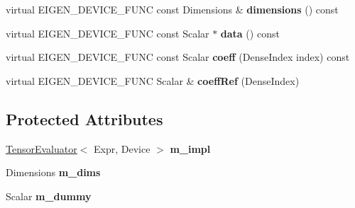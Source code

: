 \begin{DoxyCompactItemize}
virtual E\+I\+G\+E\+N\+\_\+\+D\+E\+V\+I\+C\+E\+\_\+\+F\+U\+NC const Dimensions \& {\bfseries dimensions} () const
\item 
\mbox{\label{class_eigen_1_1internal_1_1_tensor_lazy_evaluator_read_only_a7c8ec665c2e9effadbf47efed7f17b5a}} 
virtual E\+I\+G\+E\+N\+\_\+\+D\+E\+V\+I\+C\+E\+\_\+\+F\+U\+NC const Scalar $\ast$ {\bfseries data} () const
\item 
\mbox{\label{class_eigen_1_1internal_1_1_tensor_lazy_evaluator_read_only_a54b066c8eeaeda76c88ea9ed7cfa8293}} 
virtual E\+I\+G\+E\+N\+\_\+\+D\+E\+V\+I\+C\+E\+\_\+\+F\+U\+NC const Scalar {\bfseries coeff} (Dense\+Index index) const
\item 
\mbox{\label{class_eigen_1_1internal_1_1_tensor_lazy_evaluator_read_only_ac5b017f1ff541a4bbd93772bdb07d5e3}} 
virtual E\+I\+G\+E\+N\+\_\+\+D\+E\+V\+I\+C\+E\+\_\+\+F\+U\+NC Scalar \& {\bfseries coeff\+Ref} (Dense\+Index)
\end{DoxyCompactItemize}
\subsection*{Protected Attributes}
\begin{DoxyCompactItemize}
\item 
\mbox{\label{class_eigen_1_1internal_1_1_tensor_lazy_evaluator_read_only_a20d9c40ea2b7e9ebd8f3d0f7e29b2b70}} 
\hyperlink{struct_eigen_1_1_tensor_evaluator}{Tensor\+Evaluator}$<$ Expr, Device $>$ {\bfseries m\+\_\+impl}
\item 
\mbox{\label{class_eigen_1_1internal_1_1_tensor_lazy_evaluator_read_only_ad33b801c1e31036b586a99efff61240b}} 
Dimensions {\bfseries m\+\_\+dims}
\item 
\mbox{\label{class_eigen_1_1internal_1_1_tensor_lazy_evaluator_read_only_a6aa92c7410f95edac750337e5c1e2528}} 
Scalar {\bfseries m\+\_\+dummy}
\end{DoxyCompactItemize}


